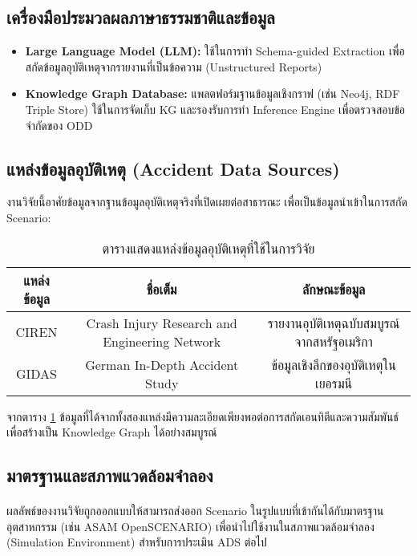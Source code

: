 \subsection{เครื่องมือประมวลผลภาษาธรรมชาติและข้อมูล}
\begin{itemize}
 \item \textbf{Large Language Model (LLM):} ใช้ในการทำ Schema-guided Extraction เพื่อสกัดข้อมูลอุบัติเหตุจากรายงานที่เป็นข้อความ (Unstructured Reports)
 \item \textbf{Knowledge Graph Database:} แพลตฟอร์มฐานข้อมูลเชิงกราฟ (เช่น Neo4j, RDF Triple Store) ใช้ในการจัดเก็บ KG และรองรับการทำ Inference Engine เพื่อตรวจสอบข้อจำกัดของ ODD
\end{itemize}

\subsection{แหล่งข้อมูลอุบัติเหตุ (Accident Data Sources)}
งานวิจัยนี้อาศัยข้อมูลจากฐานข้อมูลอุบัติเหตุจริงที่เปิดเผยต่อสาธารณะ เพื่อเป็นข้อมูลนำเข้าในการสกัด Scenario:
\begin{table}[h!]
 \centering
 \caption{ตารางแสดงแหล่งข้อมูลอุบัติเหตุที่ใช้ในการวิจัย}
 \label{tab:data-sources}
 \begin{tabular}{|c|c|c|}
 \hline
 แหล่งข้อมูล & ชื่อเต็ม & ลักษณะข้อมูล \\
 \hline
 CIREN \cite{nhtsa_ciren} & Crash Injury Research and Engineering Network & รายงานอุบัติเหตุฉบับสมบูรณ์จากสหรัฐอเมริกา \\
\hline
GIDAS \cite{gidas_study} & German In-Depth Accident Study & ข้อมูลเชิงลึกของอุบัติเหตุในเยอรมนี \\
 \hline
 \end{tabular}
\end{table}

จากตาราง \ref{tab:data-sources} ข้อมูลที่ได้จากทั้งสองแหล่งมีความละเอียดเพียงพอต่อการสกัดเอนทิตีและความสัมพันธ์เพื่อสร้างเป็น Knowledge Graph ได้อย่างสมบูรณ์

\subsection{มาตรฐานและสภาพแวดล้อมจำลอง}\paragraph{}

ผลลัพธ์ของงานวิจัยถูกออกแบบให้สามารถส่งออก Scenario ในรูปแบบที่เข้ากันได้กับมาตรฐานอุตสาหกรรม (เช่น ASAM OpenSCENARIO) เพื่อนำไปใช้งานในสภาพแวดล้อมจำลอง (Simulation Environment) สำหรับการประเมิน ADS ต่อไป

